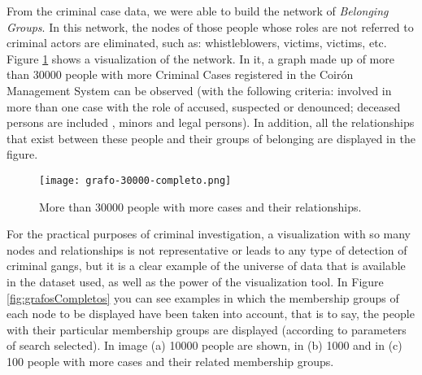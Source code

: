From the criminal case data, we were able to build the network of \textit{Belonging Groups}. In this network, the nodes of those people whose roles are not referred to criminal actors are eliminated, such as: whistleblowers, victims, victims, etc. Figure \ref{fig:grafocompleto} shows a visualization of the network. In it, a graph made up of more than 30000 people with more Criminal Cases registered in the Coirón Management System can be observed (with the following criteria: involved in more than one case with the role of accused, suspected or denounced; deceased persons are included , minors and legal persons). In addition, all the relationships that exist between these people and their groups of belonging are displayed in the figure.

\vspace{-10pt}
\begin{figure}
	\centering
	\texttt{[image: grafo-30000-completo.png]}
	\caption{More than 30000 people with more cases and their relationships.} 
	\label{fig:grafocompleto}
\end{figure}
\vspace{-10pt}
For the practical purposes of criminal investigation, a visualization with so many nodes and relationships is not representative or leads to any type of detection of criminal gangs, but it is a clear example of the universe of data that is available in the dataset used, as well as the power of the visualization tool. In Figure \ref{fig:grafosCompletos} you can see examples in which the membership groups of each node to be displayed have been taken into account, that is to say, the people with their particular membership groups are displayed (according to parameters of search selected). In image (a) 10000 people are shown, in (b) 1000 and in (c) 100 people with more cases and their related membership groups.
